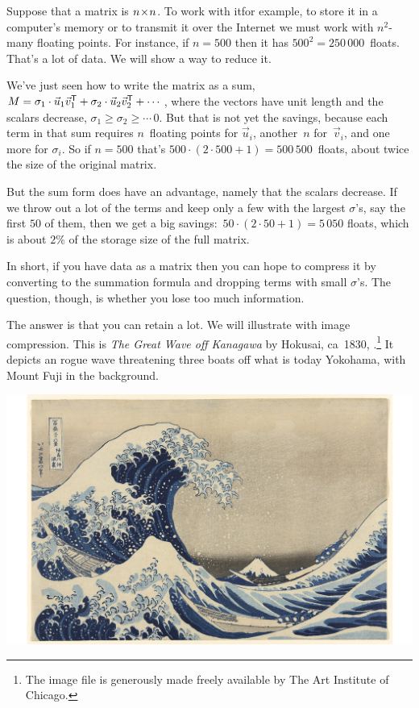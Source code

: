 Suppose that a matrix is $n \! \times \! n$.
To work with it\Dash for example, 
to store it in a computer's memory or to transmit it over the Internet\Dash 
we must work with $n^2$-many floating points.
For instance, if $n=500$ then it has $500^2=250\,000$~floats.
That's a lot of data.
We will show a way to reduce it. 

We've just seen how to write the matrix as a sum,
$M=\sigma_1\cdot\vec{u}_1{{\vec{v}}^{\mathsf{T}}}_1
   +\sigma_2\cdot\vec{u}_2{{\vec{v}}^{\mathsf{T}}}_2
   +\cdots\,$,
where the vectors have unit length and the scalars decrease, 
$\sigma_1\geq \sigma_2\geq \cdots\, 0$.
But that is not yet the savings, because
each term in that sum requires 
$n$~floating points for $\vec{u}_i$, another~$n$ for~$\vec{v}_i$, and one
more for $\sigma_i$.
So if $n=500$ that's $500\cdot(2\cdot 500+1)=500\,500$~floats,
about twice the size of the original matrix.

But the sum form does have an advantage, namely that the scalars decrease.
If we throw out a lot of the terms and keep only a few with the largest $\sigma$'s,
say the first $50$ of them, 
then we get a big savings:~$50\cdot (2\cdot 50+1)=5\,050$ floats,  
which is about $2\%$ of the storage size of the full matrix.

In short, if you have data as a matrix then you can hope to compress it
by converting to the summation formula and dropping terms with small $\sigma$'s.  
The question, though, is whether you lose too much information.

The answer is that you can retain a lot.
We will illustrate with image compression.
This is \textit{The Great Wave off Kanagawa} by Hokusai, ca~1830,
\cite{wiki:GreatWave}.\footnote{%
  The image file is
  generously made freely available by The Art Institute of Chicago.}
It depicts an rogue wave threatening three boats off 
what is today Yokohama, with Mount Fuji in the background. 
\begin{center}
  \includegraphics[width=.95\textwidth]{pix/greatwave.png} %
\end{center}

